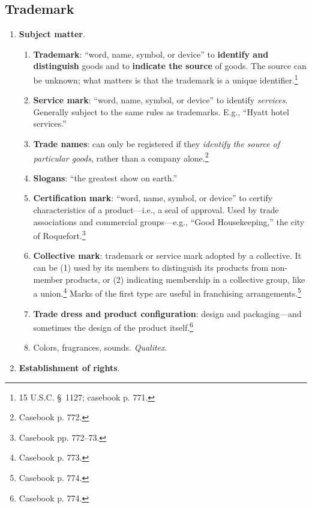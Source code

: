 \newpage

\subsection{Trademark}

\begin{enumerate}
    \item \textbf{Subject matter}.
    \begin{enumerate}
        \item \textbf{Trademark}: ``word, name, symbol, or device'' to 
        \textbf{identify and distinguish} goods and to \textbf{indicate the 
        source} of goods. The source can be unknown; what matters is that the 
        trademark is a unique identifier.\footnote{15 U.S.C. \S\ 1127; 
        casebook p.  771.}
        \item \textbf{Service mark}: ``word, name, symbol, or device'' to 
        identify \emph{services}. Generally subject to the same rules as 
        trademarks. E.g., ``Hyatt hotel services.''
        \item \textbf{Trade names}: can only be registered if they 
        \emph{identify the source of particular goods}, rather than a company 
        alone.\footnote{Casebook p. 772.}
        \item \textbf{Slogans}: ``the greatest show on earth.''
        \item \textbf{Certification mark}: ``word, name, symbol, or device'' 
        to certify characteristics of a product---i.e., a seal of approval.  
        Used by trade associations and commercial groups---e.g., ``Good 
        Housekeeping,'' the city of Roquefort.\footnote{Casebook pp. 772--73.}
        \item \textbf{Collective mark}: trademark or service mark adopted by a 
        collective. It can be (1) used by its members to distinguish its 
        products from non-member products, or (2) indicating membership in a 
        collective group, like a union.\footnote{Casebook p. 773.} Marks of 
        the first type are useful in franchising 
        arrangements.\footnote{Casebook p. 774.}
        \item \textbf{Trade dress and product configuration}: design and 
        packaging---and sometimes the design of the product 
        itself.\footnote{Casebook p. 774.}
        \item Colors, fragrances, sounds. \emph{Qualitex}.
    \end{enumerate}
    \item \textbf{Establishment of rights}.

\end{enumerate}
